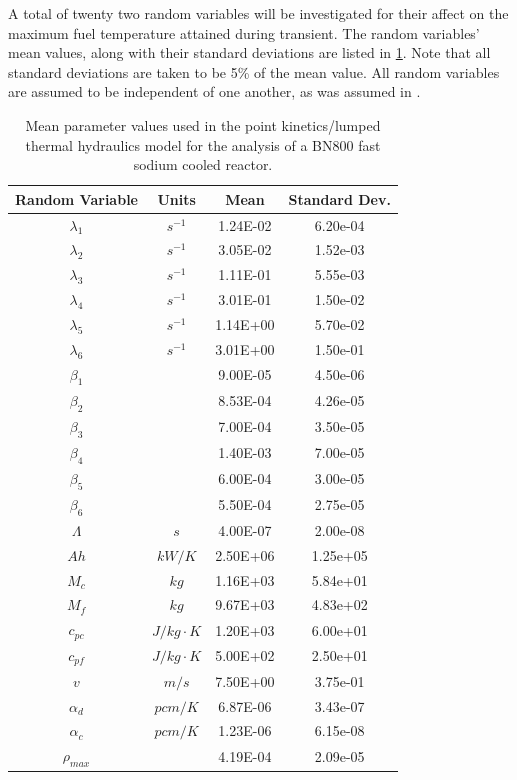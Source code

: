 A total of twenty two random variables will be investigated for their affect on the maximum fuel temperature attained during transient. The random variables' mean values, along with their standard deviations are listed in \ref{table:pkinetics_parameters}. Note that all standard deviations are taken to be 5\% of the mean value. All random variables are assumed to be independent of one another, as was assumed in \cite{Gilli_mc2011}. 
\begin{table} 
\caption{\label{table:pkinetics_parameters} 
Mean parameter values used in the point kinetics/lumped thermal hydraulics model for the analysis of a BN800 fast sodium cooled reactor.}
\centering
\begin{tabular}{||c|c|c|c||} 
\hline \hline
\textbf{Random Variable} & \textbf{Units} & \textbf{Mean} & \textbf{Standard Dev.} \\ \hline
$\lambda_1$  &  $s^{-1}$      &  1.24E-02  &  6.20e-04  \\ \hline
$\lambda_2$  &  $s^{-1}$      &  3.05E-02  &  1.52e-03  \\ \hline
$\lambda_3$  &  $s^{-1}$      &  1.11E-01  &  5.55e-03  \\ \hline
$\lambda_4$  &  $s^{-1}$      &  3.01E-01  &  1.50e-02  \\ \hline
$\lambda_5$  &  $s^{-1}$      &  1.14E+00  &  5.70e-02  \\ \hline
$\lambda_6$  &  $s^{-1}$      &  3.01E+00  &  1.50e-01  \\ \hline
$\beta_1$    &                &  9.00E-05  &  4.50e-06  \\ \hline
$\beta_2$    &                &  8.53E-04  &  4.26e-05  \\ \hline
$\beta_3$    &                &  7.00E-04  &  3.50e-05  \\ \hline
$\beta_4$    &                &  1.40E-03  &  7.00e-05  \\ \hline
$\beta_5$    &                &  6.00E-04  &  3.00e-05  \\ \hline
$\beta_6$    &                &  5.50E-04  &  2.75e-05  \\ \hline
$\Lambda$    &  $s$           &  4.00E-07  &  2.00e-08  \\ \hline
$Ah$         &  $kW/K$        &  2.50E+06  &  1.25e+05  \\ \hline
$M_c$        &  $kg$          &  1.16E+03  &  5.84e+01  \\ \hline
$M_f$        &  $kg$          &  9.67E+03  &  4.83e+02  \\ \hline
$c_{pc}$     &  $J/kg\cdot K$ &  1.20E+03  &  6.00e+01  \\ \hline
$c_{pf}$     &  $J/kg\cdot K$ &  5.00E+02  &  2.50e+01  \\ \hline
$v$          &  $m/s$         &  7.50E+00  &  3.75e-01  \\ \hline
$\alpha_d $  &  $pcm/K$       &  6.87E-06  &  3.43e-07  \\ \hline
$\alpha_c$   &  $pcm/K$       &  1.23E-06  &  6.15e-08  \\ \hline
$\rho_{max}$ &                &  4.19E-04  &  2.09e-05  \\ 
\hline \hline
\end{tabular}
\end{table}
